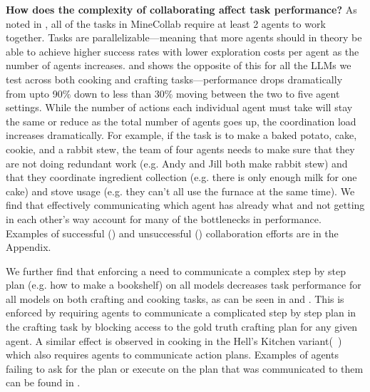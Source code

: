 \documentclass{article}
\begin{document}
\textbf{How does the complexity of collaborating affect task performance?}
As noted in , all of the tasks in MineCollab require at least 2 agents to work together.
Tasks are parallelizable---meaning that more agents should in theory be able to achieve higher success rates with lower exploration costs per agent as the number of agents increases.
 and  shows the opposite of this for all the LLMs we test across both cooking and crafting tasks---performance drops dramatically from upto 90\% down to less than 30\% moving between the two to five agent settings.
While the number of actions each individual agent must take will stay the same or reduce as the total number of agents goes up, the coordination load increases dramatically.
For example, if the task is to make a baked potato, cake, cookie, and a rabbit stew, the team of four agents needs to make sure that they are not doing redundant work (e.g. Andy and Jill both make rabbit stew) and that they coordinate ingredient collection (e.g. there is only enough milk for one cake) and stove usage (e.g. they can't all use the furnace at the same time).
We find that effectively communicating which agent has already what and not getting in each other's way account for many of the bottlenecks in performance.
Examples of successful () and unsuccessful () collaboration efforts are in the Appendix.

We further find that enforcing a need to communicate a complex step by step plan (e.g. how to make a bookshelf) on all models decreases task performance for all models on both crafting and cooking tasks, as can be seen in  and .
This is enforced by requiring agents to communicate a complicated step by step plan in the crafting task by blocking access to the gold truth crafting plan for any given agent.
A similar effect is observed in cooking in the Hell's Kitchen variant(~) which also requires agents to communicate action plans.
Examples of agents failing to ask for the plan or execute on the plan that was communicated to them can be found in .
\end{document}
